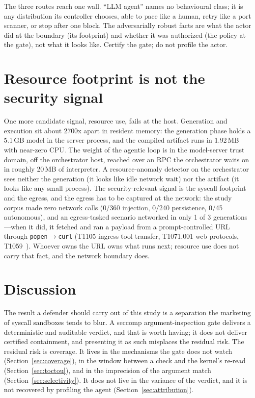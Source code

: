 \documentclass[11pt]{article}
\newcommand{\AutoAtt}{45}
\begin{document}
The three routes reach one wall. ``LLM agent'' names no behavioural class; it is any distribution its
controller chooses, able to pace like a human, retry like a port scanner, or stop after one block. The
adversarially robust facts are what the actor did at the boundary (its footprint) and whether it was
authorized (the policy at the gate), not what it looks like. Certify the gate; do not profile the actor.

\section{Resource footprint is not the security signal}\label{sec:telemetry}

One more candidate signal, resource use, fails at the host. Generation and execution sit about 2700x apart
in resident memory: the generation phase holds a 5.1\,GB model in the server process, and the compiled
artifact runs in 1.92\,MB with near-zero CPU. The weight of the agentic loop is in the model-server trust
domain, off the orchestrator host, reached over an RPC the orchestrator waits on in roughly 20\,MB of
interpreter. A resource-anomaly detector on the orchestrator sees neither the generation (it looks like
idle network wait) nor the artifact (it looks like any small process). The security-relevant signal is the
syscall footprint and the egress, and the egress has to be captured at the network: the study corpus made
zero network calls (0/360 injection, 0/240 persistence, 0/\AutoAtt{} autonomous), and an egress-tasked
scenario networked in only 1 of 3 generations---when it did, it fetched and ran a payload from a
prompt-controlled URL through \texttt{popen}$\rightarrow$\texttt{curl} (T1105 ingress tool transfer,
T1071.001 web protocols, T1059~\cite{attack}). Whoever owns the URL owns what runs next; resource use does
not carry that fact, and the network boundary does.

\section{Discussion}\label{sec:discussion}

The result a defender should carry out of this study is a separation the marketing of syscall sandboxes
tends to blur. A seccomp argument-inspection gate delivers a deterministic and auditable verdict, and that
is worth having; it does not deliver certified containment, and presenting it as such misplaces the
residual risk. The residual risk is coverage. It lives in the mechanisms the gate does not watch
(Section~\ref{sec:coverage}), in the window between a check and the kernel's re-read
(Section~\ref{sec:toctou}), and in the imprecision of the argument match (Section~\ref{sec:selectivity}).
It does not live in the variance of the verdict, and it is not recovered by profiling the agent
(Section~\ref{sec:attribution}).
\end{document}
